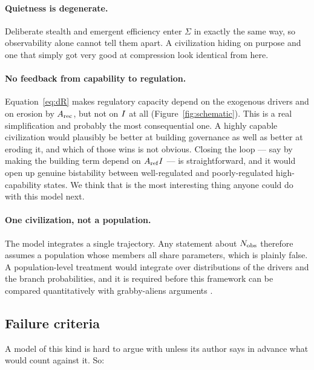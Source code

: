 \paragraph{Quietness is degenerate.} Deliberate stealth and emergent efficiency
enter $\Sigma$ in exactly the same way, so observability alone cannot tell them
apart. A civilization hiding on purpose and one that simply got very good at
compression look identical from here.

\paragraph{No feedback from capability to regulation.} Equation~\eqref{eq:dR}
makes regulatory capacity depend on the exogenous drivers and on erosion by
$A_{\mathrm{rec}}$, but not on $I$ at all (Figure~\ref{fig:schematic}). This is a real
simplification and probably the most consequential one. A highly capable
civilization would plausibly be better at building governance as well as better
at eroding it, and which of those wins is not obvious. Closing the loop --- say
by making the building term depend on $A_{\mathrm{ref}} I$ --- is straightforward, and
it would open up genuine bistability between well-regulated and poorly-regulated
high-capability states. We think that is the most interesting thing anyone could
do with this model next.

\paragraph{One civilization, not a population.} The model integrates a single
trajectory. Any statement about $N_{\mathrm{obs}}$ therefore assumes a population whose
members all share parameters, which is plainly false. A population-level
treatment would integrate over distributions of the drivers and the branch
probabilities, and it is required before this framework can be compared
quantitatively with grabby-aliens arguments
\citep{hanson2021grabby,prantzos2020}.

\subsection{Failure criteria}

A model of this kind is hard to argue with unless its author says in advance
what would count against it. So:

